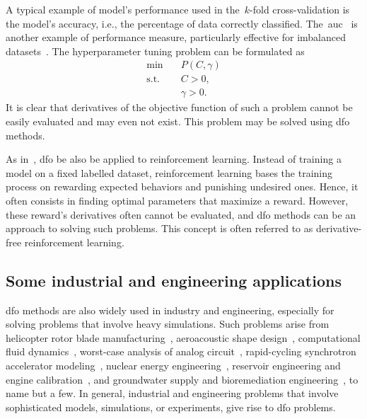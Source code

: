 A typical example of model's performance used in the~$k$-fold cross-validation is the model's accuracy, i.e., the percentage of data correctly classified.
The~\gls{auc}~\cite{Hanley_Mcneil_1982} is another example of performance measure, particularly effective for imbalanced datasets~\cite{Bradley_1997}.
The hyperparameter tuning problem can be formulated as
\begin{equation*}
    \begin{aligned}
        \min        & \quad P(C, \gamma)\\
        \text{s.t.} & \quad C > 0,\\
                    & \quad \gamma > 0.
    \end{aligned}
\end{equation*}
It is clear that derivatives of the objective function of such a problem cannot be easily evaluated and may even not exist.
This problem may be solved using \gls{dfo} methods.

As in~\cite{Qian_Yu_2021}, \gls{dfo} be also be applied to reinforcement learning.
Instead of training a model on a fixed labelled dataset, reinforcement learning bases the training process on rewarding expected behaviors and punishing undesired ones.
Hence, it often consists in finding optimal parameters that maximize a reward.
However, these reward's derivatives often cannot be evaluated, and \gls{dfo} methods can be an approach to solving such problems.
This concept is often referred to as derivative-free reinforcement learning.


\subsection{Some industrial and engineering applications}

\Gls{dfo} methods are also widely used in industry and engineering, especially for solving problems that involve heavy simulations.
Such problems arise from helicopter rotor blade manufacturing~\cite{Booker_Etal_1998a,Booker_Etal_1998b,Serafini_1998}, aeroacoustic shape design~\cite{Marsden_2004,Marsden_Etal_2004}, computational fluid dynamics~\cite{Duvigneau_Visonneau_2004}, worst-case analysis of analog circuit~\cite{Latorre_Etal_2019}, rapid-cycling synchrotron accelerator modeling~\cite{Eldred_Etal_2021}, nuclear energy engineering~\cite{Kortelainen_Etal_2010,Kortelainen_Etal_2012,Kortelainen_Etal_2014}, reservoir engineering and engine calibration~\cite{Langouet_2011}, and groundwater supply and bioremediation engineering~\cite{Fowler_Etal_2008,Mugunthan_Shoemaker_Regis_2005,Yoon_Shoemaker_1999}, to name but a few.
In general, industrial and engineering problems that involve sophisticated models, simulations, or experiments, give rise to \gls{dfo} problems.

